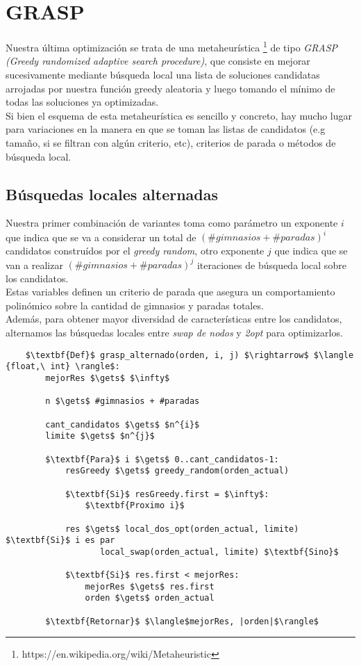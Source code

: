 \section{GRASP}
Nuestra última optimización se trata de una metaheurística \footnote{https://en.wikipedia.org/wiki/Metaheuristic} de tipo \emph{GRASP (Greedy randomized adaptive search procedure)}, que consiste en mejorar sucesivamente mediante búsqueda local una lista de soluciones candidatas arrojadas por nuestra función greedy aleatoria y luego tomando el mínimo de todas las soluciones ya optimizadas.
\\

Si bien el esquema de esta metaheurística es sencillo y concreto, hay mucho lugar para variaciones en la manera en que se toman las listas de candidatos (e.g tamaño, si se filtran con algún criterio, etc), criterios de parada o métodos de búsqueda local.
\\

\subsection{Búsquedas locales alternadas}
Nuestra primer combinación de variantes toma como parámetro un exponente $i$ que indica que se va a considerar un total de $(\#gimnasios + \#paradas)^i$ candidatos construídos por el \emph{greedy random}, otro exponente $j$ que indica que se van a realizar $(\#gimnasios + \#paradas)^j$ iteraciones de búsqueda local sobre los candidatos.
\\

Estas variables definen un criterio de parada que asegura un comportamiento polinómico sobre la cantidad de gimnasios y paradas totales.
\\

Además, para obtener mayor diversidad de características entre los candidatos, alternamos las búsquedas locales entre \emph{swap de nodos} y \emph{2opt} para optimizarlos.

\begin{lstlisting}
    $\textbf{Def}$ grasp_alternado(orden, i, j) $\rightarrow$ $\langle {float,\ int} \rangle$:
        mejorRes $\gets$ $\infty$

        n $\gets$ #gimnasios + #paradas

        cant_candidatos $\gets$ $n^{i}$
        limite $\gets$ $n^{j}$

        $\textbf{Para}$ i $\gets$ 0..cant_candidatos-1:
            resGreedy $\gets$ greedy_random(orden_actual)

            $\textbf{Si}$ resGreedy.first = $\infty$:
                $\textbf{Proximo i}$

            res $\gets$ local_dos_opt(orden_actual, limite) $\textbf{Si}$ i es par
                   local_swap(orden_actual, limite) $\textbf{Sino}$

            $\textbf{Si}$ res.first < mejorRes:
                mejorRes $\gets$ res.first
                orden $\gets$ orden_actual

        $\textbf{Retornar}$ $\langle$mejorRes, |orden|$\rangle$
\end{lstlisting}

